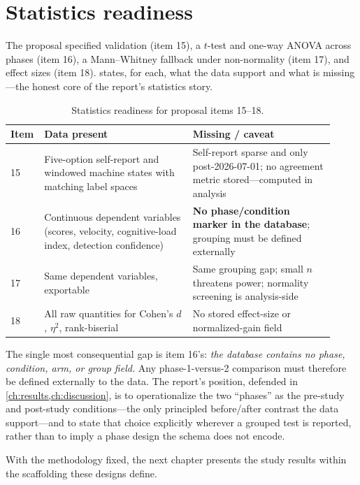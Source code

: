 \section{Statistics readiness}
\label{sec:methodology-stats}

The proposal specified validation (item 15), a $t$-test and one-way ANOVA
across phases (item 16), a Mann--Whitney fallback under non-normality
(item 17), and effect sizes (item 18).  states,
for each, what the data support and what is missing---the honest core of
the report's statistics story.

\begin{table}[htbp]
\centering
\small
\caption{Statistics readiness for proposal items 15--18.}
\label{tab:stats-readiness}
\begin{tabular}{@{}p{0.06\linewidth}p{0.44\linewidth}p{0.42\linewidth}@{}}
\toprule
Item & Data present & Missing / caveat \\
\midrule
15 & Five-option self-report and windowed machine states with matching
label spaces & Self-report sparse and only post-2026-07-01; no agreement
metric stored---computed in analysis \\
16 & Continuous dependent variables (scores, velocity, cognitive-load
index, detection confidence) & \textbf{No phase/condition marker in the
database}; grouping must be defined externally \\
17 & Same dependent variables, exportable & Same grouping gap; small $n$
threatens power; normality screening is analysis-side \\
18 & All raw quantities for Cohen's $d$, $\eta^2$, rank-biserial & No
stored effect-size or normalized-gain field \\
\bottomrule
\end{tabular}
\end{table}

The single most consequential gap is item 16's: \emph{the database
contains no phase, condition, arm, or group field.} Any phase-1-versus-2
comparison must therefore be defined externally to the data. The report's
position, defended in \cref{ch:results,ch:discussion}, is to operationalize
the two ``phases'' as the pre-study and post-study conditions---the only
principled before/after contrast the data support---and to state that
choice explicitly wherever a grouped test is reported, rather than to
imply a phase design the schema does not encode.

\medskip
\noindent With the methodology fixed, the next chapter presents the study
results within the scaffolding these designs define.
